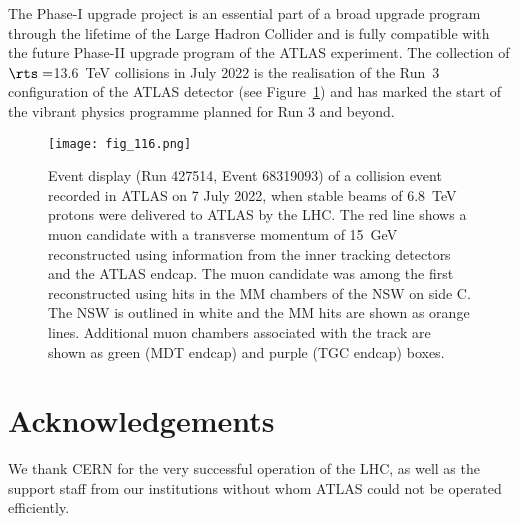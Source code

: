\documentclass[cernpreprint, atlasdraft=false, UKenglish,british,orcidlogo, texmf, orcidlogo]{atlasdoc}
\begin{document}
The Phase-I upgrade project is an essential part of a broad upgrade program through the lifetime of the Large Hadron Collider and is fully compatible with the future Phase-II upgrade program of the ATLAS experiment. The collection of $\rts=$\SI{13.6}{\TeV} collisions in July 2022 is the realisation of the Run~3 configuration of the ATLAS detector (see Figure~\ref{fig:Run3EventDisplay_NSW}) and has marked the start of the vibrant physics programme planned for Run 3 and beyond.
 
\begin{figure}[t]
\centerline{\texttt{[image: fig\_116.png]}}
\caption{Event display (Run 427514, Event 68319093) of a collision event recorded in ATLAS on 7 July 2022, when stable beams of \SI{6.8}{\TeV} protons were delivered to ATLAS by the \gls{LHC}. The red line shows a muon candidate with a transverse momentum of \SI{15}{\GeV} reconstructed using information from the inner tracking detectors and the ATLAS  endcap. The muon candidate was among the first reconstructed using hits in the \gls{MM} chambers of the \gls{NSW} on side C. The \gls{NSW} is outlined in white and the \gls{MM} hits are shown as orange lines. Additional muon chambers associated with the track are shown as green (\gls{MDT} endcap) and purple (\gls{TGC} endcap) boxes. 
}
\label{fig:Run3EventDisplay_NSW}
\end{figure}


\clearpage
\newpage
 
\section*{Acknowledgements}
 

 
 
We thank CERN for the very successful operation of the LHC, as well as the
support staff from our institutions without whom ATLAS could not be
operated efficiently.
 
\end{document}
